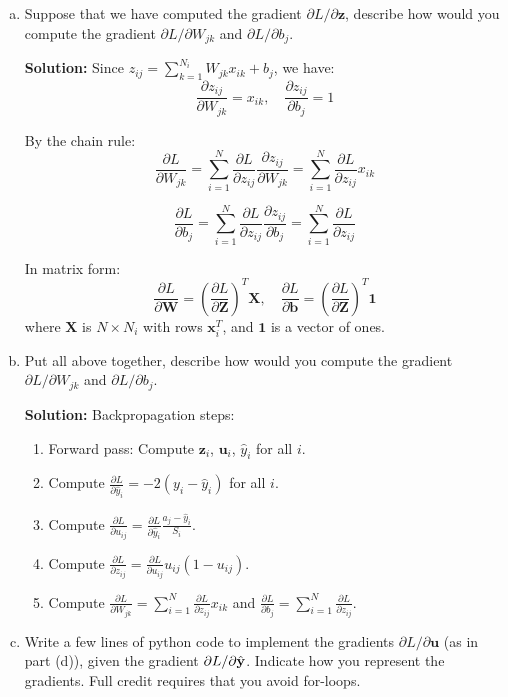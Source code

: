 \documentclass[11pt]{article}
\newcommand{\one}{\mathbf{1}}
\newcommand{\bbf}{\mathbf{b}}
\newcommand{\ubf}{\mathbf{u}}
\newcommand{\xbf}{\mathbf{x}}
\newcommand{\zbf}{\mathbf{z}}
\newcommand{\Wbf}{\mathbf{W}}
\newcommand{\Xbf}{\mathbf{X}}
\newcommand{\Zbf}{\mathbf{Z}}
\begin{document}
\begin{enumerate}
\begin{enumerate}[(a)]
\item
Suppose that we have computed the gradient $\partial L/\partial \zbf$, describe how would you compute the gradient
 $\partial L/\partial W_{jk}$ and $\partial L/\partial b_j$.

\textbf{Solution:}
Since $z_{ij} = \sum_{k=1}^{N_i} W_{jk} x_{ik} + b_j$, we have:
\[
\frac{\partial z_{ij}}{\partial W_{jk}} = x_{ik}, \quad \frac{\partial z_{ij}}{\partial b_j} = 1
\]

By the chain rule:
\[
\frac{\partial L}{\partial W_{jk}} = \sum_{i=1}^N \frac{\partial L}{\partial z_{ij}} \frac{\partial z_{ij}}{\partial W_{jk}} = \sum_{i=1}^N \frac{\partial L}{\partial z_{ij}} x_{ik}
\]

\[
\frac{\partial L}{\partial b_j} = \sum_{i=1}^N \frac{\partial L}{\partial z_{ij}} \frac{\partial z_{ij}}{\partial b_j} = \sum_{i=1}^N \frac{\partial L}{\partial z_{ij}}
\]

In matrix form:
\[
\frac{\partial L}{\partial \Wbf} = \left(\frac{\partial L}{\partial \Zbf}\right)^T \Xbf, \quad \frac{\partial L}{\partial \bbf} = \left(\frac{\partial L}{\partial \Zbf}\right)^T \one
\]
where $\Xbf$ is $N \times N_i$ with rows $\xbf_i^T$, and $\one$ is a vector of ones.

 \item
 Put all above together, describe how would you compute the gradient  $\partial L/\partial W_{jk}$ and $\partial L/\partial b_j$.

\textbf{Solution:}
Backpropagation steps:
\begin{enumerate}
\item Forward pass: Compute $\zbf_i$, $\ubf_i$, $\hat{y}_i$ for all $i$.
\item Compute $\frac{\partial L}{\partial \hat{y}_i} = -2(y_i - \hat{y}_i)$ for all $i$.
\item Compute $\frac{\partial L}{\partial u_{ij}} = \frac{\partial L}{\partial \hat{y}_i} \frac{a_j - \hat{y}_i}{S_i}$.
\item Compute $\frac{\partial L}{\partial z_{ij}} = \frac{\partial L}{\partial u_{ij}} u_{ij}(1 - u_{ij})$.
\item Compute $\frac{\partial L}{\partial W_{jk}} = \sum_{i=1}^N \frac{\partial L}{\partial z_{ij}} x_{ik}$ and $\frac{\partial L}{\partial b_j} = \sum_{i=1}^N \frac{\partial L}{\partial z_{ij}}$.
\end{enumerate}

\item Write a few lines of python code to implement the gradients  $\partial L/\partial \ubf$ (as in part (d)), given the gradient $\partial L/\partial \hat{\bf y}$.
Indicate how you represent the gradients.
Full credit requires that you avoid for-loops.


\end{enumerate}
\end{enumerate}
\end{document}
